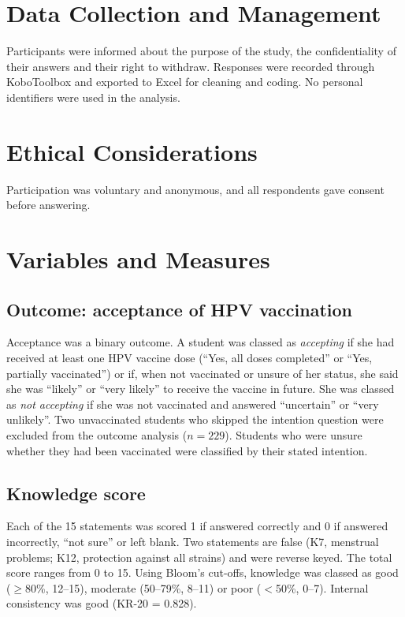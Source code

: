 \section{Data Collection and Management}
Participants were informed about the purpose of the study, the confidentiality of their answers and their right to withdraw. Responses were recorded through KoboToolbox and exported to Excel for cleaning and coding.  No personal identifiers were used in the analysis.

\section{Ethical Considerations}
Participation was voluntary and anonymous, and all respondents gave consent before answering. 

\section{Variables and Measures}
\subsection{Outcome: acceptance of HPV vaccination}
Acceptance was a binary outcome. A student was classed as \emph{accepting} if she had received at least one HPV vaccine dose (``Yes, all doses completed'' or ``Yes, partially vaccinated'') or if, when not vaccinated or unsure of her status, she said she was ``likely'' or ``very likely'' to receive the vaccine in future. She was classed as \emph{not accepting} if she was not vaccinated and answered ``uncertain'' or ``very unlikely''. Two unvaccinated students who skipped the intention question were excluded from the outcome analysis ($n=229$). Students who were unsure whether they had been vaccinated were classified by their stated intention.

\subsection{Knowledge score}
Each of the 15 statements was scored 1 if answered correctly and 0 if answered incorrectly, ``not sure'' or left blank. Two statements are false (K7, menstrual problems; K12, protection against all strains) and were reverse keyed. The total score ranges from 0 to 15. Using Bloom's cut-offs, knowledge was classed as good ($\geq$80\%, 12--15), moderate (50--79\%, 8--11) or poor ($<$50\%, 0--7). Internal consistency was good (KR-20 = 0.828).

